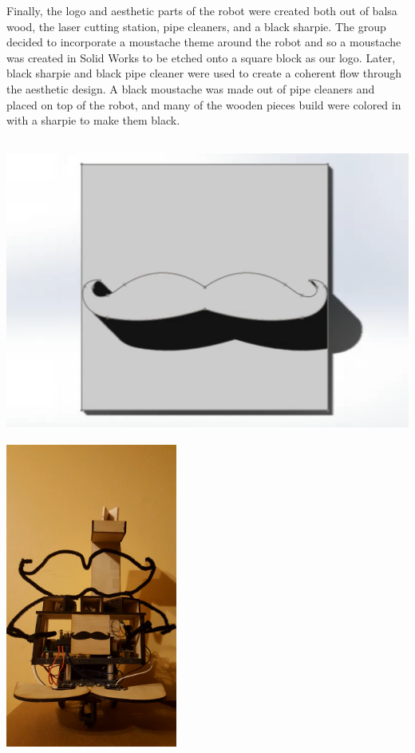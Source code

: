 \documentclass{article}
\begin{document}
	Finally, the logo and aesthetic parts of the robot were created both out of balsa wood, the laser cutting station, pipe cleaners, and a black sharpie. The group decided to incorporate a moustache theme around the robot and so a moustache was created in Solid Works to be etched onto a square block as our logo. Later, black sharpie and black pipe cleaner were used to create a coherent flow through the aesthetic design. A black moustache was made out of pipe cleaners and placed on top of the robot, and many of the wooden pieces build were colored in with a sharpie to make them black. \\ 
	
	\begin{center}
	\includegraphics[height=10cm]{LOGO.png}
	\includegraphics[height=10cm]{Robot.png}
	\end{center}
	
\end{document}
